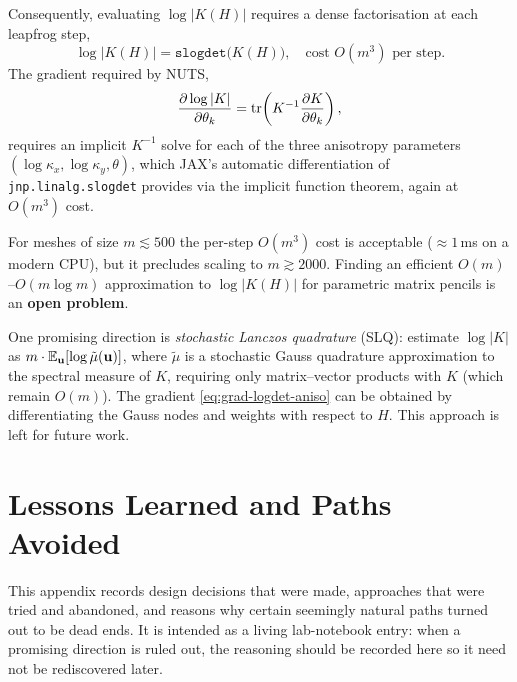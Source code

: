 \documentclass[11pt]{article}
\begin{document}
Consequently, evaluating $\log|K(H)|$ requires a dense factorisation at each
leapfrog step,
\begin{equation}
  \log|K(H)| = \texttt{slogdet}\bigl(K(H)\bigr),
  \quad\text{cost } O(m^3) \text{ per step.}
  \label{eq:slogdet-aniso}
\end{equation}
The gradient required by NUTS,
\begin{equation}
  \frac{\partial\log|K|}{\partial\theta_k}
  = \operatorname{tr}\!\left(K^{-1}\frac{\partial K}{\partial\theta_k}\right),
  \label{eq:grad-logdet-aniso}
\end{equation}
requires an implicit $K^{-1}$ solve for each of the three anisotropy
parameters $(\log\kappa_x, \log\kappa_y, \theta)$, which JAX's automatic
differentiation of \texttt{jnp.linalg.slogdet} provides via the implicit
function theorem, again at $O(m^3)$ cost.

For meshes of size $m \lesssim 500$ the per-step $O(m^3)$ cost is acceptable
($\approx\!1$\,ms on a modern CPU), but it precludes scaling to
$m \gtrsim 2000$.  Finding an efficient $O(m)$--$O(m\log m)$ approximation
to $\log|K(H)|$ for parametric matrix pencils is an \textbf{open problem}.

\begin{remark}
One promising direction is \emph{stochastic Lanczos quadrature} (SLQ):
estimate $\log|K|$ as $m\cdot\mathbb{E}_{\mathbf{u}}[\log\tilde\mu(\mathbf{u})]$,
where $\tilde\mu$ is a stochastic Gauss quadrature approximation to the
spectral measure of $K$, requiring only matrix--vector products with $K$
(which remain $O(m)$).  The gradient \eqref{eq:grad-logdet-aniso} can be
obtained by differentiating the Gauss nodes and weights with respect to $H$.
This approach is left for future work.
\end{remark}




\appendix

\section{Lessons Learned and Paths Avoided}
\label{sec:lessons}

This appendix records design decisions that were made, approaches that were
tried and abandoned, and reasons why certain seemingly natural paths turned out
to be dead ends.  It is intended as a living lab-notebook entry: when a
promising direction is ruled out, the reasoning should be recorded here so it
need not be rediscovered later.
\end{document}
